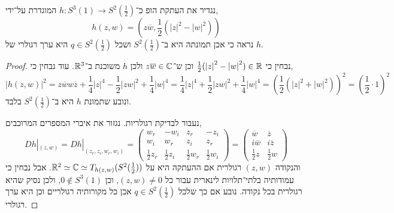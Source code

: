 \question{}
נגדיר את העתקת הופ כ־$h : S^3(1) \to S^2(\frac{1}{2})$ המוגדרת על־ידי,
\[
	h(z, w)
	= (z \overline{w}, \frac{1}{2} ({|z|}^2 - {|w|}^2))
\]
נראה כי אכן תמונתה היא ב־$S^2(\frac{1}{2})$ ושכל $q \in S^2(\frac{1}{2})$ היא ערך רגולרי של $h$.
\begin{proof}
	נבחין כי $\frac{1}{2} ({|z|}^2 - {|w|}^2) \in \mathbb{R}$ וכן ש־$z \overline{w} \in \mathbb{C}$ ולכן $h$ משוכנת ב־$\mathbb{R}^3$.
	עוד נבחין כי,
	\[
		{|h(z, w)|}^2
		= z \overline{w} w \overline{z} + \frac{1}{4} {|z|}^4 - \frac{1}{2} {|zw|}^2 + \frac{1}{4} {|w|}^4
		= \frac{1}{4} {|z|}^4 + \frac{1}{2} {|zw|}^2 + \frac{1}{4} {|w|}^4
		= {\left(\frac{1}{2} ({|z|}^2 + {|w|}^2)\right)}^2
		= {\left(\frac{1}{2} \cdot 1\right)}^2
	\]
	ונובע שתמונת $h$ היא ב־$S^2(\frac{1}{2})$ בלבד.

	נעבור לבדיקת רגולריות.
	נגזור את איברי המספרים המרוכבים,
	\[
		D h |_{(z, w)}
		= D h |_{(z_r, z_i, w_r, w_i)}
		= \begin{pmatrix}
			w_r & - w_i & z_r & -z_i \\
			w_i & w_r & z_i & z_r \\
			\frac{1}{2} z_r & \frac{1}{2} z_i & \frac{1}{2} w_r & \frac{1}{2} w_i
		\end{pmatrix} 
		= \begin{pmatrix}
			\overline{w} & \overline{z} \\
			i \overline{w} & i \overline{z} \\
			\frac{1}{2} z & \frac{1}{2} w
		\end{pmatrix} 
	\]
	והנקודה $(z, w)$ רגולרית אם ההעתקה היא על $\mathbb{R}^2 \simeq \mathbb{C} \simeq T_{h(z, w)}(S^2(\frac{1}{2}))$.
	אבל נבחין כי עמודותיה בלתי־תלויות לינארית עבור כל $(z, w) \ne 0$, וכן $0 \notin S^3(1)$, ולכן נסיק שהיא רגולרית בכל נקודה.
	נובע אם כך שלכל $q \in S^2(\frac{1}{2})$ אכן כל מקורותיה רגולריים וכן היא ערך רגולרי.
\end{proof}


